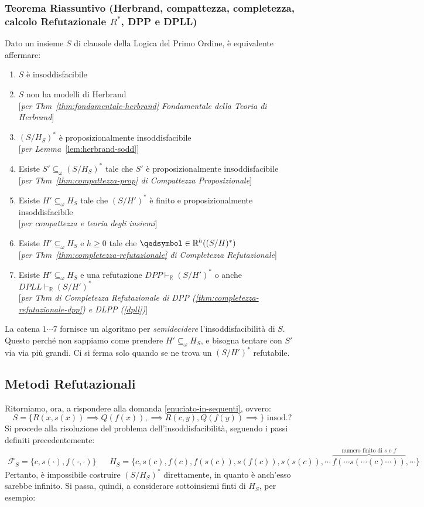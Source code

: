 \subsubsection{Teorema Riassuntivo (Herbrand, compattezza, completezza, calcolo Refutazionale $R^*$, DPP e DPLL)}
Dato un insieme $S$ di clausole della Logica del Primo Ordine, è equivalente affermare:
\begin{enumerate}
  \item $S$ è insoddisfacibile 
  \item $S$ non ha modelli di Herbrand \\
  {[\textit{per Thm~\ref{thm:fondamentale-herbrand} Fondamentale della Teoria di Herbrand}]}
  \item $(S/H_S)^*$ è proposizionalmente insoddisfacibile \\
  {[\textit{per Lemma~}\ref{lem:herbrand-sodd}]}
  \item Esiste $S' \subseteq_{\omega} (S/H_S)^*$ tale che $S'$ è proposizionalmente insoddisfacibile \\
  {[\textit{per Thm~\ref{thm:compattezza-prop} di Compattezza Proposizionale}]}
  \item Esiste $H'\subseteq_{\omega} H_S$ tale che $(S/H')^*$ è finito e proposizionalmente insoddisfacibile \\
  {[\textit{per compattezza e teoria degli insiemi}]}
  \item Esiste $H' \subseteq_{\omega} H_S$ e $h \geq 0$ tale che $\qedsymbol \in \mathbb{R}^h((S/H)^*)$ \\
  {[\textit{per Thm~\ref{thm:completezza-refutazionale} di Completezza Refutazionale}]}
  \item Esiste $H' \subseteq_{\omega} H_S$ e una refutazione $DPP \vdash_\mathbb{R} (S/H')^*$ o anche $DPLL \vdash_\mathbb{R} (S/H')^*$ \\
  {[\textit{per Thm di Completezza Refutazionale di DPP (\ref{thm:completezza-refutazionale-dpp}) e DLPP (\ref{dpll})}]}
\end{enumerate}
La catena $1 \cdots 7$ fornisce un algoritmo per \textit{semidecidere} l'insoddisfacibilità di $S$. Questo perché non sappiamo come prendere $H' \subseteq_\omega H_S$, e bisogna tentare con $S'$ via via più grandi. Ci si ferma solo quando se ne trova un $(S/H')^*$ refutabile. 

\subsection{Metodi Refutazionali}
Ritorniamo, ora, a rispondere alla domanda \ref{enuciato-in-sequenti}, ovvero: 
$$
  S = \{ R(x,s(x)) \implies Q(f(x)), \implies R(c,y), Q(f(y)) \implies\} \text{ insod.?}
$$
Si procede alla risoluzione del problema dell'insoddisfacibilità, seguendo 
i passi definiti precedentemente: 
\begin{align*}
\mathscr{F}_S = \{c, s(\cdot), f(\cdot, \cdot)\} &&
H_S = \{c, s(c), f(c), f(s(c)), s(f(c)), s(s(c)), \cdots\, \overbrace{f(\cdots s( \cdots (c) \cdots))}^{\text{numero finito di } s \text{ e } f}, \cdots\}
\end{align*}
Pertanto, è impossibile costruire $(S/H_S)^*$ direttamente, in quanto è anch'esso sarebbe infinito. Si passa, quindi, a considerare sottoinsiemi finti di $H_S$, per esempio:
